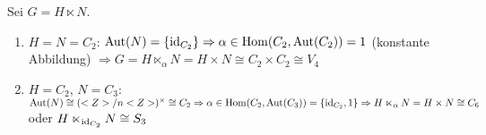 \begin{example}
	Sei $G=H\ltimes N$.
	\begin{enumerate}[label=(\alph*)]
		\item $H=N=C_2$: $\operatorname{Aut}(N)=\{\operatorname{id}_{C_2}\}\Rightarrow\alpha\in\operatorname{Hom}(C_2,\operatorname{Aut}(C_2))=1$ (konstante Abbildung) $\Rightarrow G = H\ltimes_{\alpha} N=H\times N\cong C_2\times C_2\cong V_4$
		\item $H=C_2$, $N=C_3$: $\operatorname{Aut}(N)\cong (<Z>/n<Z>)^\times\cong C_2 \Rightarrow \alpha\in\operatorname{Hom}(C_2,\operatorname{Aut}(C_3))=\{\operatorname{id}_{C_2}, 1\}\Rightarrow H\ltimes_{\alpha} N = H\times N\cong C_6$ oder $H\ltimes_{\operatorname{id}_{C_2}}N\cong S_3$
	\end{enumerate}
\end{example}